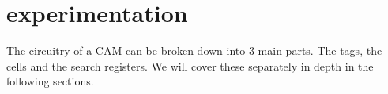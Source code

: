 \section{experimentation}
The circuitry of a CAM can be broken down into 3 main parts. The tags, the cells and the search registers. 
We will cover these separately in depth in the following sections. 
